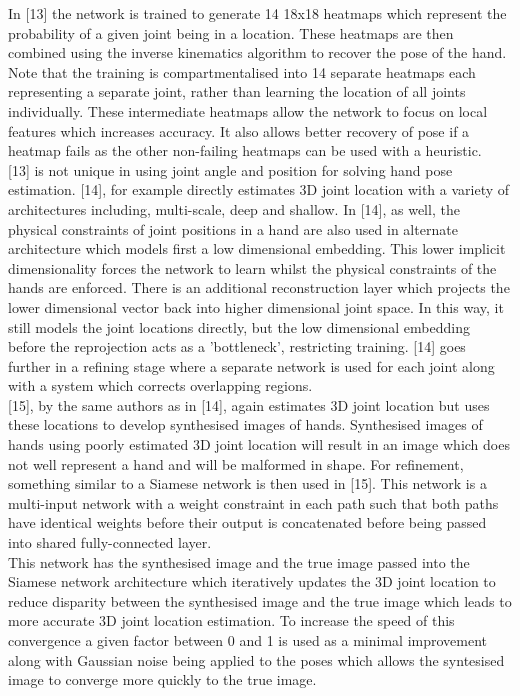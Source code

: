 \documentclass{article}
\begin{document}
In [13] the network is trained to generate 14 18x18 heatmaps which represent the probability of a given joint being in a location. These heatmaps are then combined using the inverse kinematics algorithm to recover the pose of the hand. Note that the training is compartmentalised into 14 separate heatmaps each representing a separate joint, rather than learning the location of all joints individually. These intermediate heatmaps allow the network to focus on local features which increases accuracy. It also allows better recovery of pose if a heatmap fails as the other non-failing heatmaps can be used with a heuristic.\\

[13] is not unique in using joint angle and position for solving hand pose estimation. [14], for example directly estimates 3D joint location with a variety of architectures including, multi-scale, deep and shallow. In [14], as well, the physical constraints of joint positions in a hand are also used in alternate architecture which models first a low dimensional embedding. This lower implicit dimensionality forces the network to learn whilst the physical constraints of the hands are enforced. There is an additional reconstruction layer which projects the lower dimensional vector back into higher dimensional joint space. In this way, it still models the joint locations directly, but the low dimensional embedding before the reprojection acts as a 'bottleneck', restricting training. [14] goes further in a refining stage where a separate network is used for each joint along with a system which corrects overlapping regions.\\

[15], by the same authors as in [14], again estimates 3D joint location but uses these locations to develop synthesised images of hands. Synthesised images of hands using poorly estimated 3D joint location will result in an image which does not well represent a hand and will be malformed in shape. For refinement, something similar to a Siamese network is then used in [15]. This network is a multi-input network with a weight constraint in each path such that both paths have identical weights before their output is concatenated before being passed into shared fully-connected layer.\\

This network has the synthesised image and the true image passed into the Siamese network architecture which iteratively updates the 3D joint location to reduce disparity between the synthesised image and the true image which leads to more accurate 3D joint location estimation. To increase the speed of this convergence a given factor between 0 and 1 is used as a minimal improvement along with Gaussian noise being applied to the poses which allows the syntesised image to converge more quickly to the true image.\\
\end{document}
